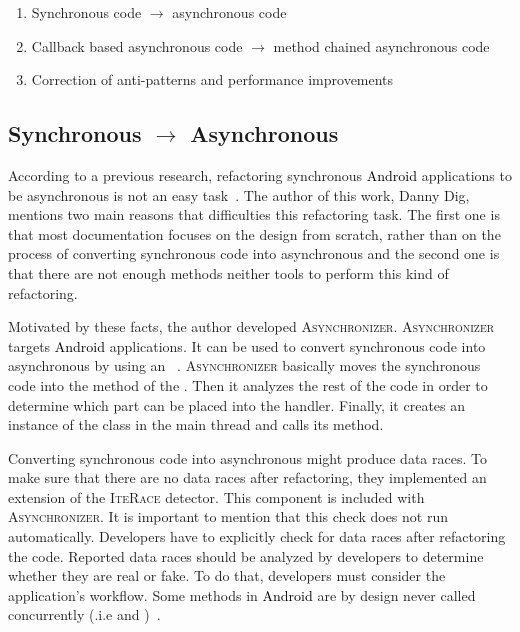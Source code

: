 \documentclass[type=bsc,accentcolor=tud9c]{tudthesis}
\newcommand{\framework}[1]{\textcolor{black}{#1}}
\begin{document}
\begin{enumerate}
	\item Synchronous code $\rightarrow$ asynchronous code
	\item Callback based asynchronous code $\rightarrow$ method chained asynchronous code
	\item Correction of anti-patterns and performance improvements
\end{enumerate}

\subsection{Synchronous $\rightarrow$ Asynchronous}
According to a previous research, refactoring synchronous \framework{Android} applications to be asynchronous is not an easy task~\cite{paperAsyncMobile}. The author of this work, Danny Dig, mentions two main reasons that difficulties this refactoring task. The first one is that most documentation focuses on the design from scratch, rather than on the process of converting synchronous code into asynchronous and the second one is that there are not enough methods neither tools to perform this kind of refactoring.

Motivated by these facts, the author developed \textsc{Asynchronizer}. \textsc{Asynchronizer} targets \framework{Android} applications. It can be used to convert synchronous code into asynchronous by using an ~\cite{paperRetrofittingConcurrency}. \textsc{Asynchronizer} basically moves the synchronous code into the  method of the . Then it analyzes the rest of the code in order to determine which part can be placed into the  handler. Finally, it creates an instance of the class in the main thread and calls its  method.

Converting synchronous code into asynchronous might produce data races. To make sure that there are no data races after refactoring, they implemented an extension of the \textsc{IteRace} detector. This component is included with \textsc{Asynchronizer}. It is important to mention that this check does not run automatically. Developers have to explicitly check for data races after refactoring the code. Reported data races should be analyzed by developers to determine whether they are real or fake. To do that, developers must consider the application's workflow. Some methods in \framework{Android} are by design never called concurrently (.i.e  and )~\cite{paperRetrofittingConcurrency}.
\end{document}
